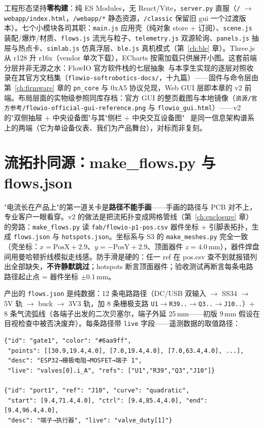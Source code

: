 工程形态坚持\textbf{零构建}：纯 ES Modules，无 React/Vite，\texttt{server.py} 直服（\texttt{/} $\to$ \texttt{webapp/index.html}，\texttt{/webapp/*} 静态资源，\texttt{/classic} 保留旧 gui 一个过渡版本）。七个小模块各司其职：\texttt{main.js} 应用壳（纯对象 store + 订阅）、\texttt{scene.js} 装配/爆炸/材质、\texttt{flows.js} 流光与粒子、\texttt{telemetry.js} 双源轮询、\texttt{panels.js} 抽屉与热点卡、\texttt{simlab.js} 仿真浮层、\texttt{ble.js} 真机模式（第~\ref{ch:ble} 章）。Three.js 从 r128 升 r16x（vendor 单次下载），ECharts 按需加载只供展开小图。这套前端分层并非无源之水：FlowIO 官方软件栈的七层抽象~\cite{flowio-docs-stack}与本孪生实现的逐层对照收录在其官方文档集（\texttt{flowio-softrobotics-docs/}，十九篇）——固件与命令层由第~\ref{ch:firmware} 章的 \texttt{pn\_core} 与 0xA5 协议兑现，Web GUI 层即本章的 v2 前端。布局层面的实物级参照同库存档：官方 GUI 的整页截图与本地镜像（\texttt{资源/官方参考/flowio-official-gui-reference.png} 与 \texttt{flowio\_gui.html}）——v2 的"双侧抽屉 + 中央设备图"与其"侧栏 + 中央交互设备图"~\cite{flowio-docs-stack} 是同一信息架构谱系上的两端（它为单设备仪表、我们为产品舞台），对标而非复刻。

\section{流拓扑同源：make\_flows.py 与 flows.json}
\label{sec:host-flows}

"电流长在产品上"的第一道关卡是\textbf{路径不能手画}——手画的路径与 PCB 对不上，专业客户一眼看穿。v2 的做法是把流拓扑变成网格管线（第~\ref{ch:enclosure} 章）的旁路：\texttt{make\_flows.py} 读 \texttt{fab/flowio-p1-pos.csv} 器件坐标 + 引脚表拓扑，生成 \texttt{flows.json} 与 \texttt{hotspots.json}。坐标系与 S3 的 \texttt{make\_meshes.py} 完全一致（壳坐标：$x=\text{PosX}+2.9$、$y=-\text{PosY}+2.9$、顶面器件 $z=4.0$\,mm），器件焊盘间用曼哈顿折线模拟走线感。防手滑是硬的：任一 ref 在 pos.csv 查不到就报错列出全部缺失，\textbf{不许静默跳过}；hotspots 断言顶面器件；验收测试再断言每条电路路径起止点 = 器件坐标 $\pm0.1$\,mm。

产出的 \texttt{flows.json} 是纯数据：12 条电路路径（DC/USB 双输入 $\to$ SS34 $\to$ 5V 轨 $\to$ buck $\to$ 3V3 轨，加 8 条栅极支路 \texttt{U1$\to$R39..$\to$Q3..$\to$J10..}）+ 8 条气流弧线（各端子出发的二次贝塞尔，端子外延 25\,mm——初版 9\,mm 假设在目视检查中被否决废弃）。每条路径带 \texttt{live} 字段——遥测数据的取值路径：

\begin{lstlisting}[basicstyle=\small\ttfamily, breaklines=true,
  caption={flows.json 的电路与气流条目（摘录）}]
{"id": "gate1", "color": "#6aa9ff",
 "points": [[30.9,19.4,4.0], [7.0,19.4,4.0], [7.0,63.4,4.0], ...],
 "desc": "ESP32→栅极电阻→MOSFET→端子 1",
 "live": "valves[0].i_A", "refs": ["U1","R39","Q3","J10"]}

{"id": "port1", "ref": "J10", "curve": "quadratic",
 "start": [9.4,71.4,4.0], "ctrl": [9.4,85.4,4.0], "end": [9.4,96.4,4.0],
 "desc": "端子→执行器", "live": "valve_duty[1]"}
\end{lstlisting}

